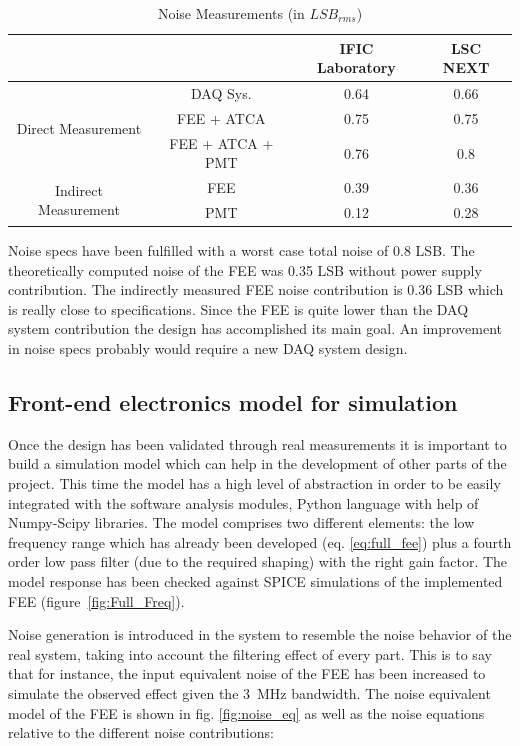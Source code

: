 \documentclass[a4paper, 10pt, oneside, twocolumn, 3p]{elsarticle}
\begin{document}
\begin{table}[ht]
	\caption{Noise Measurements (in $LSB_{rms}$)}
	\label{tab:noise}	
	\begin{center}
		\begin{tabular}{ c c || c | c |}
			& & IFIC Laboratory & LSC NEXT \\
			\hline
			\multirow{3}{*}{Direct Measurement} & DAQ Sys. & 0.64 & 0.66\\
			& FEE + ATCA & 0.75 & 0.75\\
			& FEE + ATCA + PMT & 0.76 & 0.8\\
			\hline
			\multirow{2}{*}{Indirect Measurement} & FEE & 0.39 & 0.36\\
			& PMT & 0.12 & 0.28\\
		\end{tabular}
	\end{center}
\end{table}


Noise specs have been fulfilled with a worst case total noise of 0.8 LSB. The theoretically computed noise of the FEE was 0.35 LSB without power supply contribution. The indirectly measured FEE noise contribution is 0.36 LSB which is really close to specifications. Since the FEE is quite lower than the DAQ system contribution the design has accomplished its main goal. An improvement in noise specs probably would require a new DAQ system design.

\subsection{Front-end electronics model for simulation}
Once the design has been validated through real measurements it is important to build a simulation model which can help in the development of other parts of the project. This time the model has a high level of abstraction in order to be easily integrated with the software analysis modules, Python language with help of Numpy-Scipy libraries. The model comprises two different elements: the low frequency range which has already been developed (eq. \ref{eq:full_fee}) plus a fourth order low pass filter (due to the required shaping) with the right gain factor. The model response has been checked against SPICE simulations of the implemented FEE (figure~\ref{fig:Full_Freq}).

\par Noise generation is introduced in the system to resemble the noise behavior of the real system, taking into account the filtering effect of every part. This is to say that for instance, the input equivalent noise of the FEE has been increased to simulate the observed effect given the 3~MHz bandwidth. The noise equivalent model of the FEE is shown in fig. \ref{fig:noise_eq} as well as the noise equations relative to the different noise contributions:
\end{document}
